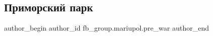  
 
 
 
 

\subsection{Приморский парк}
\label{sec:17_02_2023.fb.fb_group.mariupol.pre_war.1.primorskii_park}

\ifcmt
 author_begin
   author_id fb_group.mariupol.pre_war
 author_end
\fi
